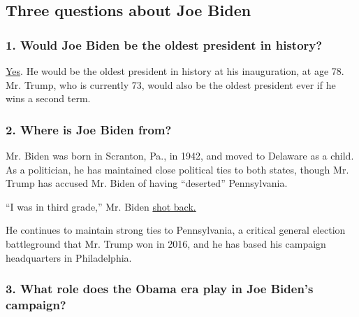 \hypertarget{three-questions-about-joe-biden}{%
\subsection{Three questions about Joe
Biden}\label{three-questions-about-joe-biden}}

\hypertarget{1-would-joe-biden-be-the-oldest-president-in-history}{%
\subsubsection{\texorpdfstring{\textbf{1. Would Joe Biden be the oldest
president in
history?}}{1. Would Joe Biden be the oldest president in history?}}\label{1-would-joe-biden-be-the-oldest-president-in-history}}

\href{https://www.nytimes.com/2019/07/29/us/politics/joe-biden-age.html}{Yes}.
He would be the oldest president in history at his inauguration, at age
78. Mr. Trump, who is currently 73, would also be the oldest president
ever if he wins a second term.

\hypertarget{2-where-is-joe-biden-from}{%
\subsubsection{\texorpdfstring{\textbf{2. Where is Joe Biden
from?}}{2. Where is Joe Biden from?}}\label{2-where-is-joe-biden-from}}

Mr. Biden was born in Scranton, Pa., in 1942, and moved to Delaware as a
child. As a politician, he has maintained close political ties to both
states, though Mr. Trump has accused Mr. Biden of having ``deserted''
Pennsylvania.

``I was in third grade,'' Mr. Biden
\href{https://www.nytimes.com/2019/05/28/us/politics/trump-biden-north-korea.html}{shot
back}\href{https://www.nytimes.com/2019/05/28/us/politics/trump-biden-north-korea.html}{.}

He continues to maintain strong ties to Pennsylvania, a critical general
election battleground that Mr. Trump won in 2016, and he has based his
campaign headquarters in Philadelphia.

\hypertarget{3-what-role-does-the-obama-era-play-in-joe-bidens-campaign}{%
\subsubsection{\texorpdfstring{\textbf{3. What role does the Obama era
play in Joe Biden's
campaign?}}{3. What role does the Obama era play in Joe Biden's campaign?}}\label{3-what-role-does-the-obama-era-play-in-joe-bidens-campaign}}

